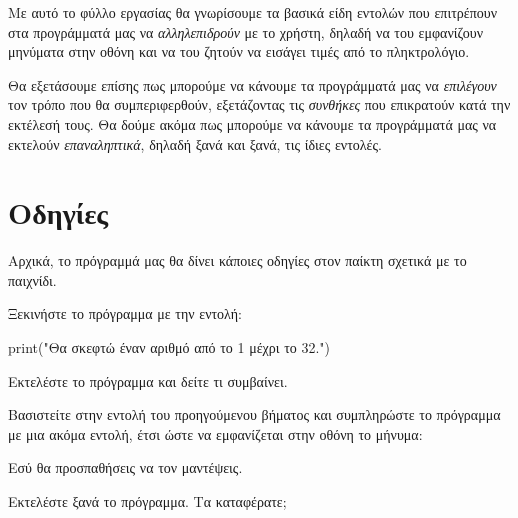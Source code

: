 \documentclass[a4paper,11pt,oneside]{book}
\begin{document}
\worksheettrue
{}


%
Με αυτό το φύλλο εργασίας θα γνωρίσουμε τα βασικά είδη εντολών που επιτρέπουν στα προγράμματά μας να \emph{αλληλεπιδρούν} με το χρήστη, δηλαδή να του εμφανίζουν μηνύματα στην οθόνη και να του ζητούν να εισάγει τιμές από το πληκτρολόγιο. 

Θα εξετάσουμε επίσης πως μπορούμε να κάνουμε τα προγράμματά μας να \emph{επιλέγουν} τον τρόπο που θα συμπεριφερθούν, εξετάζοντας τις \emph{συνθήκες} που επικρατούν κατά την εκτέλεσή τους. Θα δούμε ακόμα πως μπορούμε να κάνουμε τα προγράμματά μας να εκτελούν \emph{επαναληπτικά}, δηλαδή ξανά και ξανά, τις ίδιες εντολές.

\section{Οδηγίες}

Αρχικά, το πρόγραμμά μας θα δίνει κάποιες οδηγίες στον παίκτη σχετικά με το παιχνίδι.

\begin{step}
Ξεκινήστε το πρόγραμμα με την εντολή:

\begin{pynew}
print("Θα σκεφτώ έναν αριθμό από το 1 μέχρι το 32.")
\end{pynew}

Εκτελέστε το πρόγραμμα και δείτε τι συμβαίνει.
\end{step}

\begin{step}
Βασιστείτε στην εντολή του προηγούμενου βήματος και συμπληρώστε το πρόγραμμα με μια ακόμα εντολή, έτσι ώστε να εμφανίζεται στην οθόνη το μήνυμα:

\marginnote[16pt]{\iconcomputer}
\begin{pyterm}
Εσύ θα προσπαθήσεις να τον μαντέψεις.
\end{pyterm}

Εκτελέστε ξανά το πρόγραμμα. Τα καταφέρατε;

\marginnote[14pt]{\icondiscuss}
\dottedline
\end{step}
\end{document}
